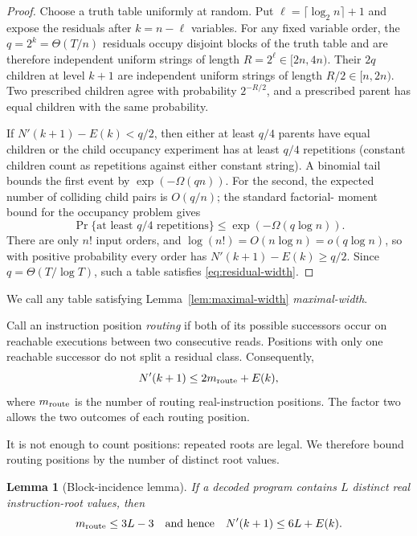 \documentclass[11pt]{article}
\newtheorem{lemma}[theorem]{Lemma}
\theoremstyle{definition}
\theoremstyle{remark}
\begin{document}
\begin{proof}
Choose a truth table uniformly at random.  Put
$\ell=\lceil\log_2 n\rceil+1$ and expose the residuals after
$k=n-\ell$ variables.  For any fixed variable order, the
$q=2^k=\Theta(T/n)$ residuals occupy disjoint blocks of the truth table and
are therefore independent uniform strings of length
$R=2^\ell\in[2n,4n)$.  Their $2q$ children at level $k+1$ are independent
uniform strings of length $R/2\in[n,2n)$.  Two prescribed children agree
with probability $2^{-R/2}$, and a prescribed parent has equal children with
the same probability.

If $N'(k+1)-E(k)<q/2$, then either at least $q/4$ parents have equal children
or the child occupancy experiment has at least $q/4$ repetitions (constant
children count as repetitions against either constant string).  A binomial
tail bounds the first event by $\exp(-\Omega(qn))$.  For the second, the
expected number of colliding child pairs is $O(q/n)$; the standard factorial-
moment bound for the occupancy problem gives
\[
  \Pr\{\text{at least }q/4\text{ repetitions}\}
  \le \exp(-\Omega(q\log n)).
\]
There are only $n!$ input orders, and
$\log(n!)=O(n\log n)=o(q\log n)$, so with positive probability every order has
$N'(k+1)-E(k)\ge q/2$.  Since $q=\Theta(T/\log T)$, such a table satisfies
\eqref{eq:residual-width}.
\end{proof}

We call any table satisfying Lemma~\ref{lem:maximal-width}
\emph{maximal-width}.

Call an instruction position \emph{routing} if both of its possible
successors occur on reachable executions between two consecutive reads.
Positions with only one reachable successor do not split a residual class.
Consequently,
\begin{equation}\label{eq:basic-routing}
  N'(k+1)\le 2m_{\rm route}+E(k),
\end{equation}
where $m_{\rm route}$ is the number of routing real-instruction positions.
The factor two allows the two outcomes of each routing position.

It is not enough to count positions: repeated roots are legal.  We therefore
bound routing positions by the number of distinct root values.

\begin{lemma}[Block-incidence lemma]\label{lem:block}
If a decoded program contains $L$ distinct real instruction-root values,
then
\[
  m_{\rm route}\le 3L-3
  \quad\text{and hence}\quad
  N'(k+1)\le 6L+E(k).
\]
\end{lemma}
\end{document}
